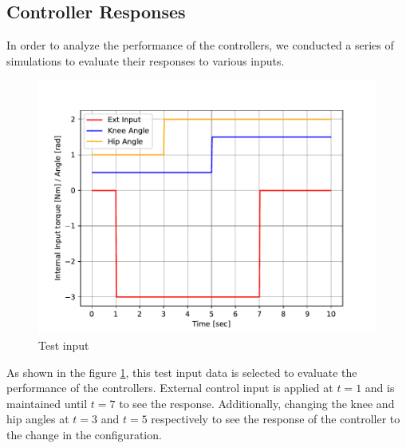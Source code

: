 \subsection{Controller Responses}
In order to analyze the performance of the controllers, we conducted a series of simulations to evaluate their responses to various inputs.
\begin{figure}[h]
	\centering
	\includegraphics[width=.5\textwidth]{Test Input}
	\caption{Test input}
	\label{fig:Test input}
\end{figure}

As shown in the figure \ref{fig:Test input}, this test input data is selected to evaluate the performance of the controllers. External control input is applied at $t=1$ and is maintained until $t=7$ to see the response. Additionally, changing the knee and hip angles at $t=3$ and $t=5$ respectively to see the response of the controller to the change in the configuration.

